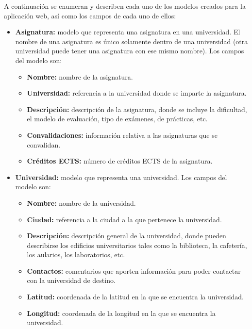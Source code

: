 \documentclass[a4paper, 12pt]{book}
\begin{document}
A continuación se enumeran y describen cada uno de los modelos creados para la aplicación web, así como los campos de cada uno de ellos:

\begin{itemize}
    \item \textbf{Asignatura:} modelo que representa una asignatura en una universidad. El nombre de una asignatura es único solamente dentro de una universidad (otra universidad puede tener una asignatura con ese mismo nombre). Los campos del modelo son:
    \begin{itemize}
        \item \textbf{Nombre:} nombre de la asignatura.
        \item \textbf{Universidad:} referencia a la universidad donde se imparte la asignatura.
        \item \textbf{Descripción:} descripción de la asignatura, donde se incluye la dificultad, el modelo de evaluación, tipo de exámenes, de prácticas, etc.
        \item \textbf{Convalidaciones:} información relativa a las asignaturas que se convalidan.
        \item \textbf{Créditos ECTS:} número de créditos ECTS de la asignatura.
    \end{itemize}

    \item \textbf{Universidad:} modelo que representa una universidad. Los campos del modelo son:
    \begin{itemize}
        \item \textbf{Nombre:} nombre de la universidad.
        \item \textbf{Ciudad:} referencia a la ciudad a la que pertenece la universidad.
        \item \textbf{Descripción:} descripción general de la universidad, donde pueden describirse los edificios universitarios tales como la biblioteca, la cafetería, los aularios, los laboratorios, etc.
        \item \textbf{Contactos:} comentarios que aporten información para poder contactar con la universidad de destino.
        \item \textbf{Latitud:} coordenada de la latitud en la que se encuentra la universidad.
        \item \textbf{Longitud:} coordenada de la longitud en la que se encuentra la universidad.
    \end{itemize}


\end{itemize}
\end{document}
